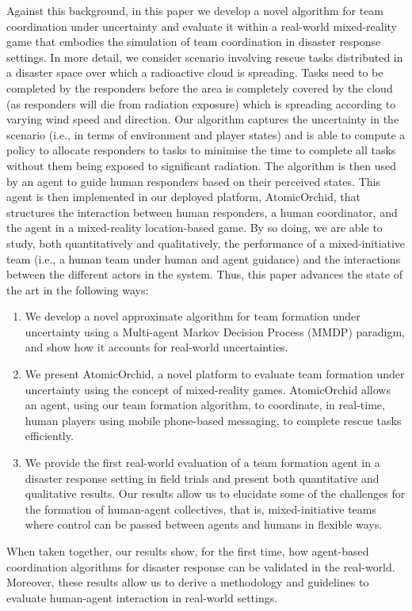 Against this background, in this paper we develop a novel algorithm for team coordination under uncertainty and evaluate it within a real-world mixed-reality game that embodies the simulation of team coordination in disaster response settings. In more detail, we consider scenario involving rescue tasks distributed in a disaster space over which a radioactive cloud is spreading. Tasks need to be completed by the responders before the area is completely covered by the cloud (as responders will die from radiation exposure) which is spreading according to varying wind speed and direction. Our algorithm captures the uncertainty in the scenario (i.e., in terms of environment and player states) and  is able to compute a policy to allocate responders to tasks to minimise the time to complete all tasks without them being exposed to significant radiation. The algorithm is then used by an agent to guide human responders based on their perceived states. This agent is then implemented in our deployed platform, AtomicOrchid, that structures the interaction between human responders, a human coordinator, and the agent in a mixed-reality location-based game. By so doing, we are able to study, both quantitatively and qualitatively, the performance of a mixed-initiative team (i.e., a human team under human and agent guidance)  and the interactions between the different actors in the system. Thus, this paper advances the state of the art in the following ways:
\begin{enumerate}
\item We develop a novel approximate algorithm for team formation under uncertainty using a Multi-agent Markov Decision Process (MMDP) paradigm, and show how it accounts for real-world uncertainties.
\item We present AtomicOrchid, a novel platform to evaluate team formation under uncertainty using the concept of mixed-reality games. AtomicOrchid allows an agent, using our team formation algorithm, to coordinate, in real-time, human players using mobile phone-based messaging, to complete rescue tasks efficiently.
\item We provide the first real-world evaluation of a team formation agent in a disaster response setting in field trials and present both quantitative and qualitative results. Our results allow us to elucidate some of the challenges for the formation of human-agent collectives, that is, mixed-initiative teams where control can be passed between agents and humans in flexible ways.
\end{enumerate}
When taken together, our results show, for the first time, how agent-based coordination algorithms for disaster response can be validated in the real-world. Moreover, these results allow us to derive a methodology and guidelines to evaluate human-agent interaction in real-world settings. 

